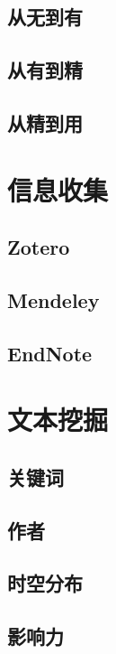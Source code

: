 \documentclass[]{book}
\begin{document}
\subsection{从无到有}

\subsection{从有到精}

\subsection{从精到用}

\section{信息收集}

\subsection{Zotero}\label{zotero}

\subsection{Mendeley}\label{mendeley}

\subsection{EndNote}\label{endnote}

\section{文本挖掘}

\subsection{关键词}

\subsection{作者}

\subsection{时空分布}

\subsection{影响力}
\end{document}
